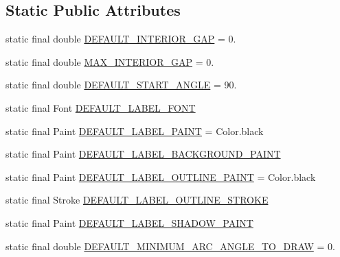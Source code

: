 \subsection*{Static Public Attributes}
\begin{DoxyCompactItemize}
\item 
static final double \mbox{\hyperlink{classorg_1_1jfree_1_1chart_1_1plot_1_1_pie_plot_a78bbd2f5386299a7a6d22977deb387b4}{D\+E\+F\+A\+U\+L\+T\+\_\+\+I\+N\+T\+E\+R\+I\+O\+R\+\_\+\+G\+AP}} = 0.
\item 
static final double \mbox{\hyperlink{classorg_1_1jfree_1_1chart_1_1plot_1_1_pie_plot_af6eadc34b067c24319681811e24d9c55}{M\+A\+X\+\_\+\+I\+N\+T\+E\+R\+I\+O\+R\+\_\+\+G\+AP}} = 0.
\item 
static final double \mbox{\hyperlink{classorg_1_1jfree_1_1chart_1_1plot_1_1_pie_plot_adf430dd198cc86b2f0d515b69dae1050}{D\+E\+F\+A\+U\+L\+T\+\_\+\+S\+T\+A\+R\+T\+\_\+\+A\+N\+G\+LE}} = 90.
\item 
static final Font \mbox{\hyperlink{classorg_1_1jfree_1_1chart_1_1plot_1_1_pie_plot_a2b4167fc959c29b242568049474f1786}{D\+E\+F\+A\+U\+L\+T\+\_\+\+L\+A\+B\+E\+L\+\_\+\+F\+O\+NT}}
\item 
static final Paint \mbox{\hyperlink{classorg_1_1jfree_1_1chart_1_1plot_1_1_pie_plot_a85d68d09ad965413e9d638be5a52ce5d}{D\+E\+F\+A\+U\+L\+T\+\_\+\+L\+A\+B\+E\+L\+\_\+\+P\+A\+I\+NT}} = Color.\+black
\item 
static final Paint \mbox{\hyperlink{classorg_1_1jfree_1_1chart_1_1plot_1_1_pie_plot_a5dde0fadc2656e43272a327b5c5aeb4c}{D\+E\+F\+A\+U\+L\+T\+\_\+\+L\+A\+B\+E\+L\+\_\+\+B\+A\+C\+K\+G\+R\+O\+U\+N\+D\+\_\+\+P\+A\+I\+NT}}
\item 
static final Paint \mbox{\hyperlink{classorg_1_1jfree_1_1chart_1_1plot_1_1_pie_plot_ac158046c8844c7e62576adce2c0cdc60}{D\+E\+F\+A\+U\+L\+T\+\_\+\+L\+A\+B\+E\+L\+\_\+\+O\+U\+T\+L\+I\+N\+E\+\_\+\+P\+A\+I\+NT}} = Color.\+black
\item 
static final Stroke \mbox{\hyperlink{classorg_1_1jfree_1_1chart_1_1plot_1_1_pie_plot_a64d07608215cc97af45e39e1b3cc6efd}{D\+E\+F\+A\+U\+L\+T\+\_\+\+L\+A\+B\+E\+L\+\_\+\+O\+U\+T\+L\+I\+N\+E\+\_\+\+S\+T\+R\+O\+KE}}
\item 
static final Paint \mbox{\hyperlink{classorg_1_1jfree_1_1chart_1_1plot_1_1_pie_plot_ae169f6262a09ae9e49d94fac9049ba9f}{D\+E\+F\+A\+U\+L\+T\+\_\+\+L\+A\+B\+E\+L\+\_\+\+S\+H\+A\+D\+O\+W\+\_\+\+P\+A\+I\+NT}}
\item 
static final double \mbox{\hyperlink{classorg_1_1jfree_1_1chart_1_1plot_1_1_pie_plot_a04961e5a3de8665a98ec19f0f6e1a1d9}{D\+E\+F\+A\+U\+L\+T\+\_\+\+M\+I\+N\+I\+M\+U\+M\+\_\+\+A\+R\+C\+\_\+\+A\+N\+G\+L\+E\+\_\+\+T\+O\+\_\+\+D\+R\+AW}} = 0.
\end{DoxyCompactItemize}
